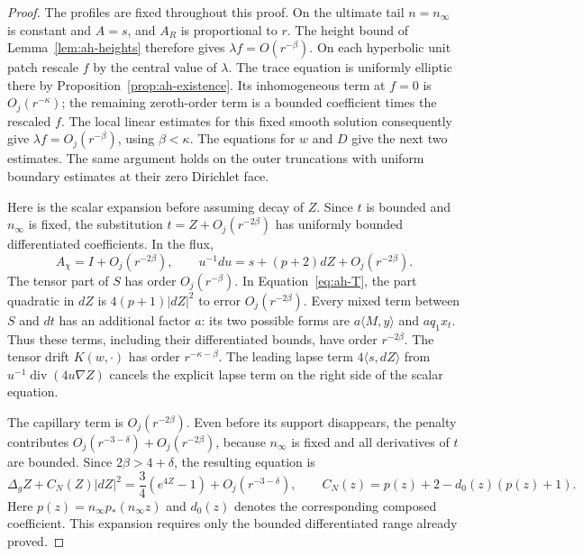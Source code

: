 \begin{proof}
The profiles are fixed throughout this proof. On the ultimate tail
\(n=n_\infty\) is constant and \(A=s\), and \(A_R\) is proportional to
\(r\). The height bound of Lemma~\ref{lem:ah-heights} therefore gives
\(\lambda f=O(r^{-\beta})\). On each hyperbolic unit patch rescale
\(f\) by the central value of \(\lambda\). The trace equation is
uniformly elliptic there by Proposition~\ref{prop:ah-existence}.
Its inhomogeneous term at \(f=0\) is \(O_j(r^{-\kappa})\); the remaining
zeroth-order term is a bounded coefficient times the rescaled \(f\).
The local linear estimates for this fixed smooth solution consequently
give \(\lambda f=O_j(r^{-\beta})\), using \(\beta<\kappa\).
The equations for \(w\) and \(D\) give the next two estimates. The same
argument holds on the outer truncations with uniform boundary estimates
at their zero Dirichlet face.

Here is the scalar expansion before assuming decay of \(Z\).
Since \(t\) is bounded and \(n_\infty\) is fixed, the substitution
\(t=Z+O_j(r^{-2\beta})\) has uniformly bounded differentiated
coefficients. In the flux,
\[
 A_\chi=I+O_j(r^{-2\beta}),\qquad
 u^{-1}du=s+(p+2)dZ+O_j(r^{-2\beta}).
\]
The tensor part of \(S\) has order \(O_j(r^{-\beta})\). In
Equation~\eqref{eq:ah-T}, the part quadratic in \(dZ\) is
\(4(p+1)|dZ|^2\) to error \(O_j(r^{-2\beta})\).
Every mixed term between \(S\) and \(dt\) has an additional factor
\(a\): its two possible forms are \(a\langle M,y\rangle\) and
\(a q_1x_t\). Thus these terms, including their differentiated
bounds, have order \(r^{-2\beta}\). The tensor drift \(K(w,\cdot)\)
has order \(r^{-\kappa-\beta}\).
The leading lapse term \(4\langle s,dZ\rangle\) from
\(u^{-1}\operatorname{div}(4u\nabla Z)\) cancels the explicit lapse
term on the right side of the scalar equation.

The capillary term is \(O_j(r^{-2\beta})\). Even before its support
disappears, the penalty contributes
\(O_j(r^{-3-\delta})+O_j(r^{-2\beta})\), because \(n_\infty\) is
fixed and all derivatives of \(t\) are bounded. Since
\(2\beta>4+\delta\), the resulting equation is
\begin{equation}\label{eq:ah-end-scalar}
 \Delta_gZ+C_N(Z)|dZ|^2
       =\frac34(e^{4Z}-1)+O_j(r^{-3-\delta}),\qquad
 C_N(z)=p(z)+2-d_0(z)(p(z)+1).
\end{equation}
Here \(p(z)=n_\infty p_*(n_\infty z)\) and \(d_0(z)\) denotes the
corresponding composed coefficient. This expansion requires only the
bounded differentiated range already proved.


\end{proof}
